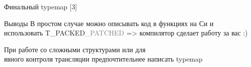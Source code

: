 \begin{frame}[fragile]{Финальный typemap [3]}

\end{frame}

\begin{frame}[fragile]{Выводы}
    В простом случае можно описывать код в функциях на Си и использовать T\_PACKED\textcolor{gray}{\_PATCHED}
    => компилятор сделает работу за вас :)
    \vspace{0.5cm}

    При работе со сложными структурами или для\\
    явного контроля трансляции предпочтительнее написать typemap
\end{frame}

\finalframe

